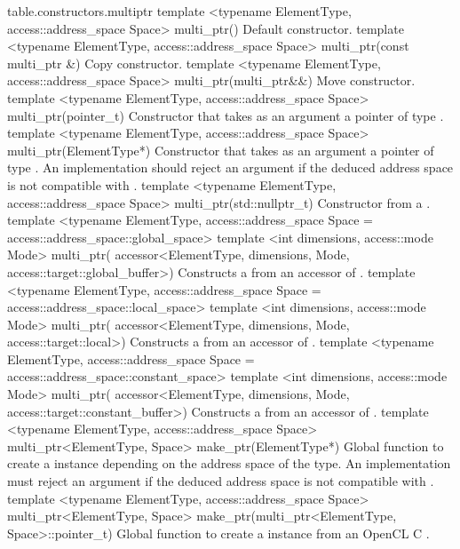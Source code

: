 {table.constructors.multiptr}
\addRowTwoL
{template <typename ElementType, access::address_space Space>}
{multi_ptr()}
{Default constructor.}
\addRowTwoL
{template <typename ElementType, access::address_space Space>}
{multi_ptr(const multi_ptr \&)}
{Copy constructor.}
\addRowTwoL
{template <typename ElementType, access::address_space Space>}
{multi_ptr(multi_ptr\&\&)}
{Move constructor.}
\addRowTwoL
{template <typename ElementType, access::address_space Space>}
{multi_ptr(pointer_t)}
{Constructor that takes as an argument a pointer of type .}
\addRowTwoL
{template <typename ElementType, access::address_space Space>}
{multi_ptr(ElementType*)}
{Constructor that takes as an argument a pointer of type .
An implementation should reject an argument if the deduced address space is not compatible with .}
\addRowTwoL
{template <typename ElementType, access::address_space Space>}
{multi_ptr(std::nullptr_t)}
{Constructor from a .}
\addRowFourL
{template <typename ElementType,
access::address_space Space = access::address_space::global_space>}
{template <int dimensions, access::mode Mode>}
{multi_ptr(}
{accessor<ElementType, dimensions, Mode, access::target::global_buffer>)}
{Constructs a
from an accessor of .}
\addRowFourL
{template <typename ElementType,
access::address_space Space = access::address_space::local_space>}
{template <int dimensions, access::mode Mode>}
{multi_ptr(}
{accessor<ElementType, dimensions, Mode, access::target::local>)}
{Constructs a
from an accessor of .}
\addRowFourL
{template <typename ElementType,
access::address_space Space = access::address_space::constant_space>}
{template <int dimensions, access::mode Mode>}
{multi_ptr(}
{accessor<ElementType, dimensions, Mode, access::target::constant_buffer>)}
{Constructs a
from an accessor of .}
\addRowTwoL
{template <typename ElementType, access::address_space Space>}
{multi_ptr<ElementType, Space> make_ptr(ElementType*)}
{
Global function to create a  instance depending
on the address space of the  type.
An implementation must reject an argument if the deduced address space is not compatible with .}
\addRowTwoL
{template <typename ElementType, access::address_space Space>}
{multi_ptr<ElementType, Space> make_ptr(multi_ptr<ElementType, Space>::pointer_t)}
{
Global function to create a  instance from
an OpenCL C .}
\completeTable


